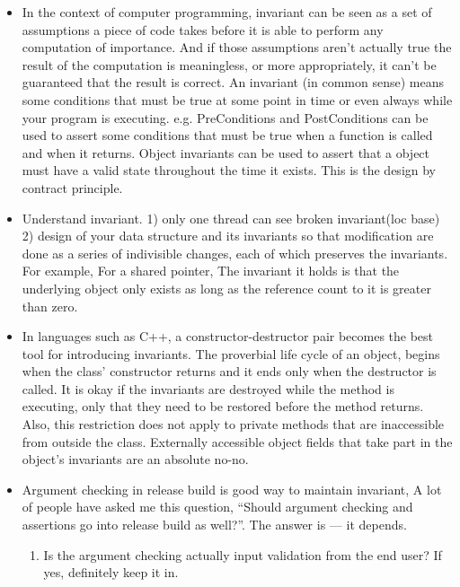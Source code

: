 \documentclass[a4paper,11pt,twoside]{book}
\begin{document}
\begin{itemize}
	\item In the context of computer programming, invariant can be seen as a set of assumptions a piece of code takes before it is able to perform any computation of importance. And if those assumptions aren’t actually true the result of the computation is meaningless, or more appropriately, it can't be guaranteed that the result is correct. An invariant (in common sense) means some conditions that must be true at some point in time or even always while your program is executing. e.g. PreConditions and PostConditions can be used to assert some conditions that must be true when a function is called and when it returns. Object invariants can be used to assert that a object must have a valid state throughout the time it exists. This is the design by contract principle.
	
	\item Understand invariant. 1) only one thread can see broken invariant(loc base) 2) design of your data structure and its invariants so that modification are done as a series of indivisible changes, each of which preserves the invariants. For example, For a shared pointer, The invariant it holds is that the underlying object only exists as long as the reference count to it is greater than zero.
	
	\item In languages such as C++, a constructor-destructor pair becomes the best tool for introducing invariants. The proverbial life cycle of an object, begins when the class’ constructor returns and it ends only when the destructor is called.  It is okay if the invariants are destroyed while the method is executing, only that they need to be restored before the method returns. Also, this restriction does not apply to private methods that are inaccessible from outside the class. Externally accessible object fields that take part in the object’s invariants are an absolute no-no.
	
	\item Argument checking in release build is good way to maintain invariant, A lot of people have asked me this question, “Should argument checking and assertions go into release build as well?”. The answer is — it depends.
	
	\begin{enumerate}
		\item Is the argument checking actually input validation from the end user? If yes, definitely keep it in.
		

\end{enumerate}
\end{itemize}
\end{document}
